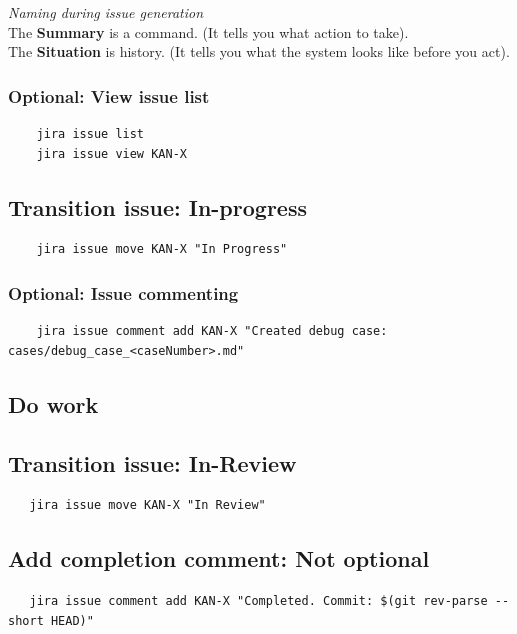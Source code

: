 \documentclass{article}
\begin{document}
\noindent \textit{Naming during issue generation}\\
The \textbf{Summary} is a command. (It tells you what action to take).\\
The \textbf{Situation} is history. (It tells you what the system looks like before you act).


\subsubsection*{Optional: View issue list}
\begin{verbatim}
    jira issue list
    jira issue view KAN-X
\end{verbatim}
 
\subsection{Transition issue: In-progress}
\begin{verbatim}
    jira issue move KAN-X "In Progress"
\end{verbatim}

\subsubsection*{Optional: Issue commenting}

\begin{verbatim}
    jira issue comment add KAN-X "Created debug case: cases/debug_case_<caseNumber>.md"
\end{verbatim}

\subsection{Do work}

\subsection{Transition issue: In-Review}

\begin{verbatim}
   jira issue move KAN-X "In Review"
\end{verbatim}




\subsection{Add completion comment: Not optional}

\begin{verbatim}
   jira issue comment add KAN-X "Completed. Commit: $(git rev-parse --short HEAD)"

\end{verbatim}
\end{document}
